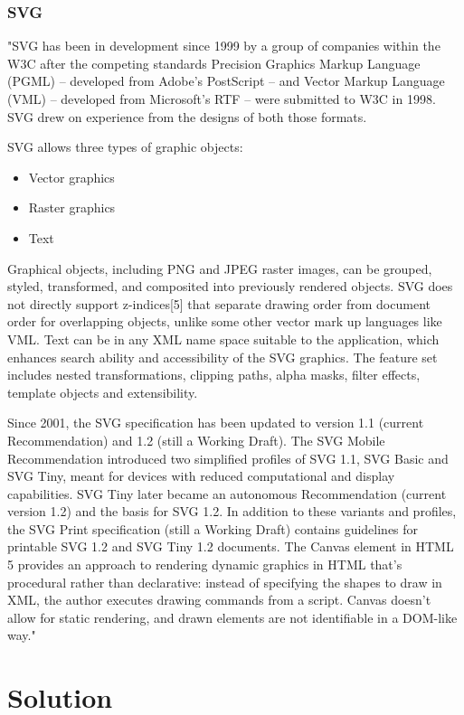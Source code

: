 \documentclass[a4paper,oneside]{article}
\begin{document}
\subsubsection{SVG}
"SVG has been in development since 1999 by a group of companies within the W3C after the competing standards Precision Graphics Markup Language (PGML) – developed from Adobe's PostScript – and Vector Markup Language (VML) – developed from Microsoft's RTF – were submitted to W3C in 1998. SVG drew on experience from the designs of both those formats.


SVG allows three types of graphic objects:
\begin{itemize}
\item Vector graphics
\item Raster graphics
\item Text
\end{itemize}

Graphical objects, including PNG and JPEG raster images, can be grouped, styled, transformed, and composited into previously rendered objects. SVG does not directly support z-indices[5] that separate drawing order from document order for overlapping objects, unlike some other vector mark up languages like VML. Text can be in any XML name space suitable to the application, which enhances search ability and accessibility of the SVG graphics. The feature set includes nested transformations, clipping paths, alpha masks, filter effects, template objects and extensibility.


Since 2001, the SVG specification has been updated to version 1.1 (current Recommendation) and 1.2 (still a Working Draft). The SVG Mobile Recommendation introduced two simplified profiles of SVG 1.1, SVG Basic and SVG Tiny, meant for devices with reduced computational and display capabilities. SVG Tiny later became an autonomous Recommendation (current version 1.2) and the basis for SVG 1.2. In addition to these variants and profiles, the SVG Print specification (still a Working Draft) contains guidelines for printable SVG 1.2 and SVG Tiny 1.2 documents.
The Canvas element in HTML 5 provides an approach to rendering dynamic graphics in HTML that's procedural rather than declarative: instead of specifying the shapes to draw in XML, the author executes drawing commands from a script. Canvas doesn't allow for static rendering, and drawn elements are not identifiable in a DOM-like way."~\cite{SVG}

\section{Solution}
\label{solution}
\end{document}
